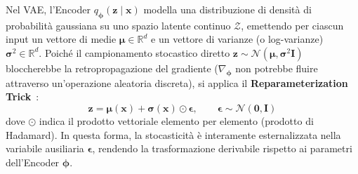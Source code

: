 \begin{definition}
Nel VAE, l'Encoder $q_{\boldsymbol{\phi}}(\mathbf{z} \mid \mathbf{x})$ modella una distribuzione di densità di probabilità gaussiana su uno spazio latente continuo $\mathcal{Z}$, emettendo per ciascun input un vettore di medie $\boldsymbol{\mu} \in \mathbb{R}^d$ e un vettore di varianze (o log-varianze) $\boldsymbol{\sigma}^2 \in \mathbb{R}^d$.
Poiché il campionamento stocastico diretto $\mathbf{z} \sim \mathcal{N}(\boldsymbol{\mu}, \boldsymbol{\sigma}^2 \mathbf{I})$ bloccherebbe la retropropagazione del gradiente ($\nabla_{\boldsymbol{\phi}}$ non potrebbe fluire attraverso un'operazione aleatoria discreta), si applica il \textbf{Reparameterization Trick}~\cite{kingma2013}:
\begin{equation}
    \mathbf{z} = \boldsymbol{\mu}(\mathbf{x}) + \boldsymbol{\sigma}(\mathbf{x}) \odot \boldsymbol{\epsilon}, \qquad \boldsymbol{\epsilon} \sim \mathcal{N}(\mathbf{0}, \mathbf{I})
\end{equation}
dove $\odot$ indica il prodotto vettoriale elemento per elemento (prodotto di Hadamard). In questa forma, la stocasticità è interamente esternalizzata nella variabile ausiliaria $\boldsymbol{\epsilon}$, rendendo la trasformazione derivabile rispetto ai parametri dell'Encoder $\boldsymbol{\phi}$.
\end{definition}

